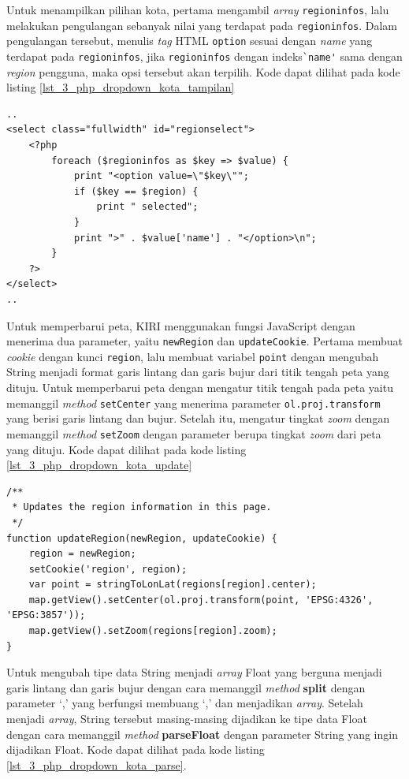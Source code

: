 Untuk menampilkan pilihan kota, pertama mengambil \textit{array} \verb!regioninfos!, lalu melakukan pengulangan sebanyak nilai yang terdapat pada \verb!regioninfos!. Dalam pengulangan tersebut, menulis \textit{tag} HTML \verb!option! sesuai dengan \textit{name} yang terdapat pada \verb!regioninfos!, jika \verb!regioninfos! dengan indeks\verb!`name'! sama dengan \textit{region} pengguna, maka opsi tersebut akan terpilih. Kode dapat dilihat pada kode listing \ref{lst_3_php_dropdown_kota_tampilan}

\begin{lstlisting}[caption=Menampilkan pilihan kota kepada pengguna ,label = {lst_3_php_dropdown_kota_tampilan}]
..
<select class="fullwidth" id="regionselect">
	<?php
		foreach ($regioninfos as $key => $value) {
			print "<option value=\"$key\"";
			if ($key == $region) {
				print " selected";
			}
			print ">" . $value['name'] . "</option>\n";
		}
	?>
</select>
..
\end{lstlisting}

Untuk memperbarui peta, KIRI menggunakan fungsi JavaScript dengan menerima dua parameter, yaitu \verb!newRegion! dan \verb!updateCookie!. Pertama membuat \textit{cookie} dengan kunci \verb!region!, lalu membuat variabel \verb!point! dengan mengubah String menjadi format garis lintang dan garis bujur dari titik tengah peta yang dituju. Untuk memperbarui peta dengan mengatur titik tengah pada peta yaitu memanggil \textit{method} \verb!setCenter! yang menerima parameter \verb!ol.proj.transform! yang berisi garis lintang dan bujur. Setelah itu, mengatur tingkat \textit{zoom} dengan memanggil \textit{method} \verb!setZoom! dengan parameter berupa tingkat \textit{zoom} dari peta yang dituju. Kode dapat dilihat pada kode listing \ref{lst_3_php_dropdown_kota_update}

\begin{lstlisting}[caption=Fungsi JavaScript untuk memperbarui peta ,label = {lst_3_php_dropdown_kota_update}]
/**
 * Updates the region information in this page.
 */
function updateRegion(newRegion, updateCookie) {
	region = newRegion;
	setCookie('region', region);
	var point = stringToLonLat(regions[region].center);
	map.getView().setCenter(ol.proj.transform(point, 'EPSG:4326', 'EPSG:3857'));
	map.getView().setZoom(regions[region].zoom);
}
\end{lstlisting}

Untuk mengubah tipe data String menjadi \textit{array} Float yang berguna menjadi garis lintang dan garis bujur dengan cara memanggil \textit{method} \textbf{split} dengan parameter `,' yang berfungsi membuang `,' dan menjadikan \textit{array}. Setelah menjadi \textit{array}, String tersebut masing-masing dijadikan ke tipe data Float dengan cara memanggil \textit{method} \textbf{parseFloat} dengan parameter String yang ingin dijadikan Float. Kode dapat dilihat pada kode listing \ref{lst_3_php_dropdown_kota_parse}.

